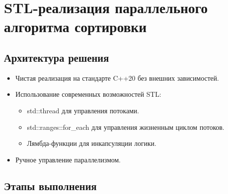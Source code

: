 \documentclass[a4paper,14pt]{extarticle}
\begin{document}
\newpage

\section*{STL-реализация параллельного алгоритма сортировки}

\subsection*{Архитектура решения}
\begin{itemize}[leftmargin=*]
    \item Чистая реализация на стандарте C++20 без внешних зависимостей.
    \item Использование современных возможностей STL:
    \begin{itemize}
        \item std::thread для управления потоками.
        \item std::ranges::for\_each для управления жизненным циклом потоков.
        \item Лямбда-функции для инкапсуляции логики.
    \end{itemize}
    \item Ручное управление параллелизмом.
\end{itemize}

\subsection*{Этапы выполнения}
\end{document}

